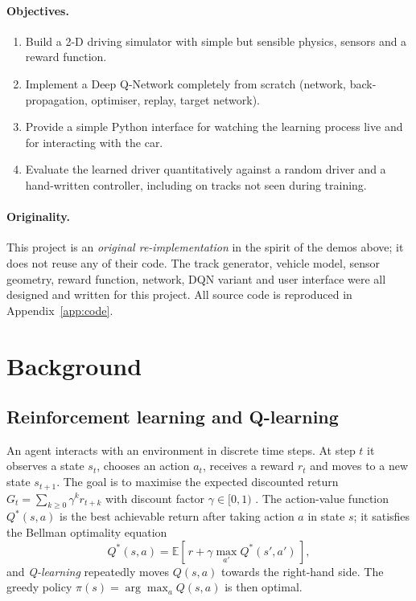 \documentclass[11pt,a4paper]{article}
\newcommand{\E}{\mathbb{E}}
\begin{document}
\paragraph{Objectives.}
\begin{enumerate}
  \item Build a 2-D driving simulator with simple but sensible physics, sensors and a reward function.
  \item Implement a Deep Q-Network completely from scratch (network, back-propagation, optimiser, replay, target network).
  \item Provide a simple Python interface for watching the learning process live and for interacting with the car.
  \item Evaluate the learned driver quantitatively against a random driver and a hand-written controller, including on tracks not seen during training.
\end{enumerate}

\paragraph{Originality.}
This project is an \emph{original re-implementation} in the spirit of the demos above; it does not reuse any of their code.
The track generator, vehicle model, sensor geometry, reward function, network, DQN variant and user interface were all designed and written for this project.
All source code is reproduced in Appendix~\ref{app:code}.

\section{Background}
\subsection{Reinforcement learning and Q-learning}
An agent interacts with an environment in discrete time steps.
At step \(t\) it observes a state \(s_t\), chooses an action \(a_t\), receives a reward \(r_t\) and moves to a new state \(s_{t+1}\).
The goal is to maximise the expected discounted return \(G_t=\sum_{k\ge0}\gamma^{k}r_{t+k}\) with discount factor \(\gamma\in[0,1)\) \cite{sutton-barto}.
The action-value function \(Q^*(s,a)\) is the best achievable return after taking action \(a\) in state \(s\); it satisfies the Bellman optimality equation
\begin{equation}
  Q^*(s,a)=\E\!\left[\,r+\gamma\max_{a'}Q^*(s',a')\,\right],
\end{equation}
and \emph{Q-learning} \cite{watkins-dayan} repeatedly moves \(Q(s,a)\) towards the right-hand side.
The greedy policy \(\pi(s)=\arg\max_aQ(s,a)\) is then optimal.
\end{document}
